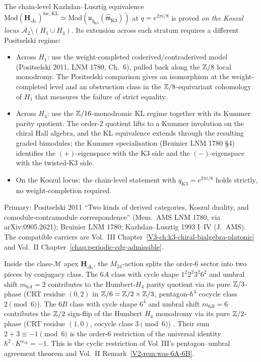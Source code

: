 \begin{remark}
\label{rem:pivpi-KL-scope}
The chain-level Kazhdan--Lusztig equivalence
$\mathrm{Mod}(\mathbf H_{\Delta_5})^{\mathrm{loc,KL}} \simeq
\mathrm{Mod}(\mathfrak u_{q_{\mathrm{K3}}}(\widehat{\mathfrak m}_{\mathrm{K3}}))$
at $q = e^{2\pi i / 8}$ is proved \emph{on the Koszul locus}
$\overline{\mathcal A_2} \setminus (H_1 \cup H_4)$. Its extension
across each stratum requires a different Positselski regime:
\begin{itemize}[leftmargin=1.5em,itemsep=0.25em]
 \item Across $H_1$: use the weight-completed coderived/contraderived
 model (Positselski 2011, LNM 1780, Ch.\ 6), pulled back along the
 $\mathbb{Z}/8$ local monodromy. The Positselski comparison gives an
 isomorphism at the weight-completed level and an obstruction class
 in the $\mathbb{Z}/8$-equivariant cohomology of $H_1$ that measures the
 failure of strict equality.
 \item Across $H_4$: use the $\mathbb{Z}/16$-monodromic KL regime together
 with its Kummer parity quotient. The order-$2$ quotient lifts to a
 Kummer involution on the chiral Hall algebra, and the KL equivalence
 extends through the resulting graded bimodules; the Kummer
 specialisation (Bruinier LNM 1780 \S 4) identifies the $(+)$-eigenspace
 with the K3 side and the $(-)$-eigenspace with the twisted-K3 side.
 \item On the Koszul locus: the chain-level statement with
 $q_{\mathrm{K3}} = e^{2\pi i / 8}$ holds strictly, no
 weight-completion required.
\end{itemize}
Primary: Positselski 2011 ``Two kinds of derived categories, Koszul
duality, and comodule-contramodule correspondence'' (Mem.\ AMS LNM
1780, via arXiv:0905.2621); Bruinier LNM 1780; Kazhdan--Lusztig 1993
I--IV (J.\ AMS). The compatible carriers are Vol.~III
Chapter~\ref{V3-ch:k3-chiral-bialgebra-platonic} and Vol.~II
Chapter~\ref{chap:periodic-cdg-admissible}.
\end{remark}

\begin{remark}
\label{rem:pivpi-M24-order6}
Inside the class-$\mathcal M$ apex $\mathbf H_{\Delta_5}$, the
$M_{24}$-action splits the order-$6$ sector into two pieces by
conjugacy class. The $6A$ class with cycle shape $1^2 2^2 3^2 6^2$
and umbral shift $m_{6A} = 2$ contributes to the Humbert-$H_4$
parity quotient via its pure $\mathbb{Z}/3$-phase (CRT residue $(0, 2)$
in $\mathbb{Z}/6 = \mathbb{Z}/2 \times \mathbb{Z}/3$, pentagon-$\hbar^3$ cocycle class
$2 \pmod 6$). The $6B$ class with cycle shape $6^4$ and umbral shift
$m_{6B} = 6$ contributes the $\mathbb{Z}/2$ sign-flip of the Humbert $H_4$
monodromy via its pure $\mathbb{Z}/2$-phase (CRT residue $(1, 0)$, cocycle
class $3 \pmod 6$) \cite{ChengDuncanHarvey2014,ConwayCurtisNortonParkerWilson1985}.
Their sum $2 + 3 \equiv -1 \pmod 6$ is the order-$6$ restriction of
the universal identity $\hbar^2 \cdot K^{\kappa_{\mathrm{ch}}} = -1$.
This is the cyclic restriction of Vol~III's pentagon--umbral agreement
theorem and Vol.~II Remark~\ref{V2-rem:was-6A-6B}.
\end{remark}

